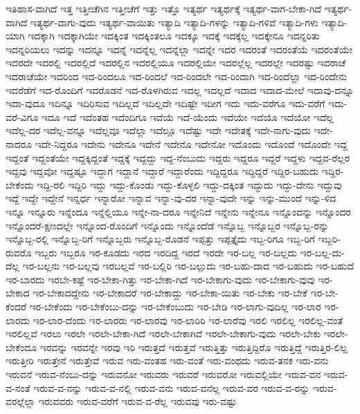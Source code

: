{ಇತಿಹಾಸ-ವಾಗಿದೆ
ಇತ್ತ
ಇತ್ತೀಚೆಗಿನ
ಇತ್ತೀಚೆಗೆ
ಇತ್ತು
ಇತ್ತೊ
ಇತ್ಯರ್ಥ
ಇತ್ಯರ್ಥಕ್ಕೆ
ಇತ್ಯರ್ಥ-ವಾಗ-ಬೇಕಾ-ಗಿದೆ
ಇತ್ಯರ್ಥ-ವಾಗಿದೆ
ಇತ್ಯರ್ಥ-ವಾಗು-ವುದು
ಇತ್ಯರ್ಥ-ವಾಯಿತು
ಇತ್ಯಾದಿ
ಇತ್ಯಾದಿ-ಗಳನ್ನು
ಇತ್ಯಾದಿ-ಗಳಿವೆ
ಇತ್ಯಾದಿ-ಗಳು
ಇತ್ಯಾದಿ-ಯಾಗಿ
ಇದಕ್ಕಾಗಿ
ಇದಕ್ಕಾಗಿಯೇ
ಇದಕ್ಕಿಂತ
ಇದಕ್ಕಿಂತಲೂ
ಇದಕ್ಕೂ
ಇದಕ್ಕೆ
ಇದಕ್ಕೆಲ್ಲ
ಇದಕ್ಕೇನೂ
ಇದನ್ನರಿತು
ಇದನ್ನರಿಯಲು
ಇದನ್ನು
ಇದನ್ನೂ
ಇದನ್ನೆ
ಇದನ್ನೆಲ್ಲ
ಇದನ್ನೆಲ್ಲಾ
ಇದನ್ನೇ
ಇದರ
ಇದರಂತೆ
ಇದರಂತೆಯೆ
ಇದರಂತೆಯೇ
ಇದರದೇ
ಇದರಲ್ಲಿ
ಇದರಲ್ಲಿದೆ
ಇದರಲ್ಲಿನ
ಇದರಲ್ಲಿಯೂ
ಇದರಲ್ಲಿಯೇ
ಇದರಲ್ಲೆಲ್ಲ
ಇದರಲ್ಲೇ
ಇದರಷ್ಟು
ಇದರಾಚೆ
ಇದರಾಚೆಯೇ
ಇದರಿಂದ
ಇದ-ರಿಂದಲೂ
ಇದ-ರಿಂದಲೆ
ಇದ-ರಿಂದಲೇ
ಇದ-ರಿಂದಾಗಿ
ಇದ-ರಿಂದೆಲ್ಲಾ
ಇದ-ರಿಂದೇನು
ಇದರೆಡೆಗೆ
ಇದ-ರೊಂದಿಗೆ
ಇದರೊಡನೆ
ಇದ-ರೊಳಗಿರುವ
ಇದಲ್ಲ
ಇದಲ್ಲದೆ
ಇದಾದ
ಇದಾದ-ಮೇಲೆ
ಇದಾವು-ದನ್ನೂ
ಇದಾ-ವುದೂ
ಇದಿನ್ನೂ
ಇದಿರಿಸುವ
ಇದಿಲ್ಲದೆ
ಇದಿಲ್ಲದೇ
ಇದಿಷ್ಟೇ
ಇದೀಗ
ಇದು
ಇದು-ವರೆಗೂ
ಇದು-ವರೆಗೆ
ಇದು-ವರೆ-ವಿಗೂ
ಇದೂ
ಇದೆ
ಇದೆಂತಹ
ಇದೆಂದಿಗೂ
ಇದೆಯೆ
ಇದೆ-ಯೆಂದು
ಇದೆಯೇ
ಇದೆಯೊ
ಇದೆಯೋ
ಇದೆಲ್ಲ
ಇದೆಲ್ಲ-ದರ
ಇದೆಲ್ಲ-ವನ್ನೂ
ಇದೆಲ್ಲವೂ
ಇದೆಲ್ಲಾ
ಇದೆಲ್ಲೂ
ಇದೆಷ್ಟು
ಇದೇ
ಇದೇತಕ್ಕೆ
ಇದೇ-ನಾಗು-ವುದು
ಇದೇ-ನಾದರೂ
ಇದೇ-ನಿದ್ದರೂ
ಇದೇನು
ಇದೇನೂ
ಇದೇನೆ
ಇದೇನೊ
ಇದೇನೋ
ಇದೊಂದು
ಇದೊಂದೆ
ಇದೊಂದೇ
ಇದ್ದ
ಇದ್ದಂತೆ
ಇದ್ದಂತೆಯೇ
ಇದ್ದಕ್ಕಿದ್ದಂತೆ
ಇದ್ದಕ್ಕೆ
ಇದ್ದದ್ದು
ಇದ್ದ-ನೆಂಬುದು
ಇದ್ದರು
ಇದ್ದರೂ
ಇದ್ದರೆ
ಇದ್ದಳು
ಇದ್ದವ-ರೆಲ್ಲರ
ಇದ್ದವು
ಇದ್ದವೋ
ಇದ್ದಷ್ಟೂ
ಇದ್ದಾಗ
ಇದ್ದಾನೆ
ಇದ್ದಾರೆ
ಇದ್ದಾರೆಂದು
ಇದ್ದಿದ್ದರೂ
ಇದ್ದಿದ್ದರೆ
ಇದ್ದಿರ-ಬಹುದು
ಇದ್ದಿರ-ಬೇಕೆಂದು
ಇದ್ದಿ-ರಲಿ
ಇದ್ದಿರಿ
ಇದ್ದು
ಇದ್ದು-ಕೊಂಡು
ಇದ್ದು-ಕೊಳ್ಳಲಿ
ಇದ್ದು-ದಕ್ಕಿಂತ
ಇದ್ದುದು
ಇದ್ದು-ದೇನು
ಇದ್ದುವು
ಇದ್ದೆ
ಇದ್ದೇ
ಇದ್ದೇನೆ
ಇನ್ನರ್ಧ
ಇನ್ನಾರೋ
ಇನ್ನಾವ
ಇನ್ನಾ-ವು-ದರ
ಇನ್ನಾ-ವುದೇ
ಇನ್ನು
ಇನ್ನು-ಮುಂದೆ
ಇನ್ನು-ಳಿದ
ಇನ್ನೂ
ಇನ್ನೂರು
ಇನ್ನೆಂದೂ
ಇನ್ನೆಲ್ಲಿಯೂ
ಇನ್ನೇ-ನಾ-ದರೂ
ಇನ್ನೇನಿದೆ
ಇನ್ನೇನು
ಇನ್ನೇನೂ
ಇನ್ನೊಂದನ್ನು
ಇನ್ನೊಂದರ
ಇನ್ನೊಂದರೆ-ಕ್ಷಣದಲ್ಲೇ
ಇನ್ನೊಂದ-ರೊಂದಿಗೆ
ಇನ್ನೊಂದು
ಇನ್ನೊಂದೆಡೆ
ಇನ್ನೊಬ್ಬ
ಇನ್ನೊಬ್ಬರ
ಇನ್ನೊಬ್ಬ-ರನ್ನು
ಇನ್ನೊಬ್ಬ-ರಲ್ಲಿ
ಇನ್ನೊಬ್ಬ-ರಿಗೆ
ಇನ್ನೊಬ್ಬರು
ಇನ್ನೊಬ್ಬ-ರೊಡನೆ
ಇಪ್ಪತ್ತು
ಇಪ್ಪತ್ತೈದು
ಇಬ್ಬ-ರಿಗೂ
ಇಬ್ಬ-ರಿಗೆ
ಇಬ್ಬರಿ-ರುವರೊ
ಇಬ್ಬರು
ಇಬ್ಬರೂ
ಇರ-ಕೂಡದು
ಇರದ
ಇರದಿದ್ದ
ಇರದೆ
ಇರದೇ
ಇರ-ಬಲ್ಲ
ಇರ-ಬಲ್ಲದು
ಇರ-ಬಲ್ಲ-ದು-ದೆಲ್ಲ
ಇರ-ಬಲ್ಲನು
ಇರ-ಬಲ್ಲವು
ಇರಬಲ್ಲವೆ
ಇರ-ಬಲ್ಲಿರಿ
ಇರ-ಬಲ್ಲುದು
ಇರ-ಬಹು-ದಾದ
ಇರ-ಬಹುದು
ಇರ-ಬಹುದೆ
ಇರ-ಬಾರದು
ಇರಬೇ-ಕಷ್ಟೆ
ಇರ-ಬೇಕಾ-ಗಿತ್ತು
ಇರ-ಬೇಕಾ-ಗಿದೆ
ಇರ-ಬೇಕಾಗು-ವುದು
ಇರ-ಬೇಕಾಗು-ವುವು
ಇರ-ಬೇಕಾದ
ಇರ-ಬೇಕಾದದ್ದೇನು
ಇರ-ಬೇಕಾದರೆ
ಇರ-ಬೇಕಾದ್ದು
ಇರ-ಬೇಕಾ-ಯಿತು
ಇರ-ಬೇಕು
ಇರ-ಬೇಕೆ
ಇರ-ಬೇ-ಕೆಂದರೆ
ಇರ-ಬೇಕೆಂದು
ಇರ-ಬೇಕೆಂಬು-ದನ್ನು
ಇರ-ಬೇಕೆಂಬುದು
ಇರ-ಬೇಡಿ
ಇರ-ಲಾಗು-ವುದಿಲ್ಲ
ಇರ-ಲಾರ
ಇರ-ಲಾರದು
ಇರ-ಲಾರ-ದೆಂದು
ಇರ-ಲಾರರು
ಇರ-ಲಾರವು
ಇರ-ಲಾರಿರಿ
ಇರ-ಲಾರೆವು
ಇರಲಿ
ಇರಲಿಲ್ಲ
ಇರಲಿಲ್ಲ-ವಂತೆ
ಇರಲಿಲ್ಲವೆ
ಇರಲು
ಇರಲೇ
ಇರಲೇ-ಬೇಕಾ-ಗಿದೆ
ಇರಲೇ-ಬೇಕಾಗಿವೆ
ಇರಲೇ-ಬೇಕಾಗು-ವುದು
ಇರಲೇ-ಬೇಕು
ಇರಲೇ-ಬೇಕೆಂದೂ
ಇರವನ್ನು
ಇರವನ್ನೇ
ಇರವು
ಇರಿ
ಇರುತ್ತದೆ
ಇರುತ್ತವೆ
ಇರುತ್ತಿತ್ತು
ಇರುತ್ತಿದ್ದಿರೊ
ಇರುತ್ತಿದ್ದೆ
ಇರುತ್ತಿರ-ಲಿಲ್ಲ
ಇರುತ್ತೀರಿ
ಇರುತ್ತೇನೆ
ಇರುತ್ತೇವೆ
ಇರುವ
ಇರು-ವಂತಹ
ಇರು-ವಂತೆ
ಇರು-ವಂಥದು
ಇರುವ-ತನಕ
ಇರು-ವನು
ಇರುವನೆ
ಇರುವ-ನೆಂಬು-ದನ್ನು
ಇರುವನೋ
ಇರುವರು
ಇರುವರೆ
ಇರುವರೋ
ಇರುವಲ್ಲಿಯೇ
ಇರುವ-ವನ
ಇರುವ-ವ-ನಂತೆ
ಇರುವ-ವ-ನನ್ನು
ಇರುವ-ವ-ನಲ್ಲಿ
ಇರುವ-ವನು
ಇರುವ-ವನೆಲ್ಲ
ಇರುವ-ವರ
ಇರುವ-ವ-ರನ್ನು
ಇರುವ-ವರಲ್ಲೆಲ್ಲಾ
ಇರುವವರು
ಇರುವ-ವರೆಗೆ
ಇರುವ-ವ-ರೆಲ್ಲ
ಇರುವವು
ಇರು-ವಷ್ಟು
}
